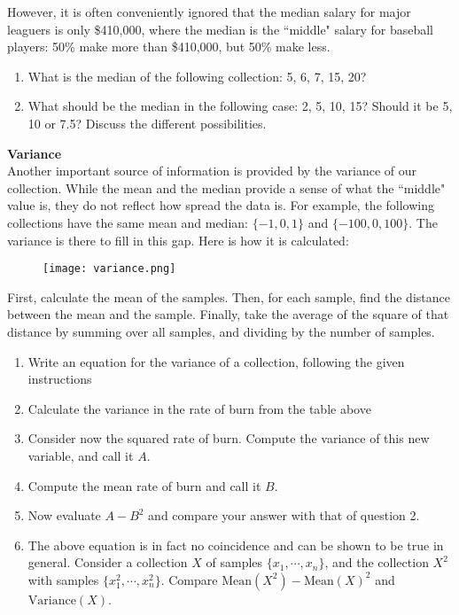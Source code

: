 {\begin{minipage}{43em}
However, it is often conveniently ignored that the median salary for major leaguers is only \$410,000, where the median is the ``middle" salary for baseball players: 50\% make more than \$410,000, but 50\% make less. \\
\begin{enumerate}[1.]
\item What is the median of the following collection: 5, 6, 7, 15, 20?
\item What should be the median in the following case: 2, 5, 10, 15? Should it be 5, 10 or 7.5? Discuss the different possibilities.
\end{enumerate}

\textbf{Variance} \\

Another important source of information is provided by the variance of our collection. While the mean and the median provide a sense of what the ``middle" value is, they do not reflect how spread the data is. For example, the following collections have the same mean and median: $\{-1, 0, 1\}$ and $\{-100, 0, 100\}$. The variance is there to fill in this gap. Here is how it is calculated:

\begin{figure}[H]
   \centering
   \texttt{[image: variance.png]} 
\end{figure}

First, calculate the mean of the samples. Then, for each sample, find the distance between the mean and the sample. Finally, take the average of the square of that distance by summing over all samples, and dividing by the number of samples. 
\begin{enumerate}[1.]
\item Write an equation for the variance of a collection, following the given instructions
\item Calculate the variance in the rate of burn from the table above
\item Consider now the squared rate of burn. Compute the variance of this new variable, and call it $A$.
\item Compute the mean rate of burn and call it $B$.
\item Now evaluate $A-B^2$ and compare your answer with that of question 2.
\item The above equation is in fact no coincidence and can be shown to be true in general. Consider a collection $X$ of samples $\{x_1,\cdots, x_n\}$, and the collection $X^2$ with samples $\{x_1^2,\cdots,x_n^2\}$. Compare $\text{Mean}(X^2)- \text{Mean}(X)^2$ and $\text{Variance}(X)$.
\end{enumerate}


\end{minipage}}
